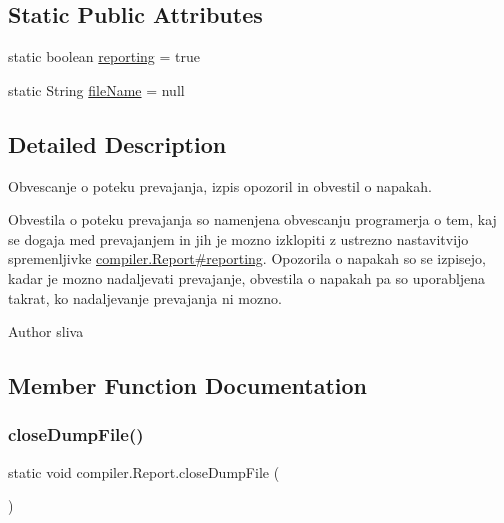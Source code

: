 \subsection*{Static Public Attributes}
\begin{DoxyCompactItemize}
\item 
static boolean \hyperlink{classcompiler_1_1_report_a8a933130e804102873fdc6ea9c926daf}{reporting} = true
\item 
static String \hyperlink{classcompiler_1_1_report_a741676f979e6e790f9e63e8900ad28f9}{file\+Name} = null
\end{DoxyCompactItemize}


\subsection{Detailed Description}
Obvescanje o poteku prevajanja, izpis opozoril in obvestil o napakah. 

Obvestila o poteku prevajanja so namenjena obvescanju programerja o tem, kaj se dogaja med prevajanjem in jih je mozno izklopiti z ustrezno nastavitvijo spremenljivke \hyperlink{classcompiler_1_1_report_a8a933130e804102873fdc6ea9c926daf}{compiler.\+Report\#reporting}. Opozorila o napakah so se izpisejo, kadar je mozno nadaljevati prevajanje, obvestila o napakah pa so uporabljena takrat, ko nadaljevanje prevajanja ni mozno.

\begin{DoxyAuthor}{Author}
sliva 
\end{DoxyAuthor}


\subsection{Member Function Documentation}
\mbox{\label{classcompiler_1_1_report_a8a76f56cadc23366cf744a99a8db9824}} 
\subsubsection{\texorpdfstring{close\+Dump\+File()}{closeDumpFile()}}
{\footnotesize\ttfamily static void compiler.\+Report.\+close\+Dump\+File (\begin{DoxyParamCaption}{ }\end{DoxyParamCaption})\hspace{0.3cm}{\ttfamily [static]}}

